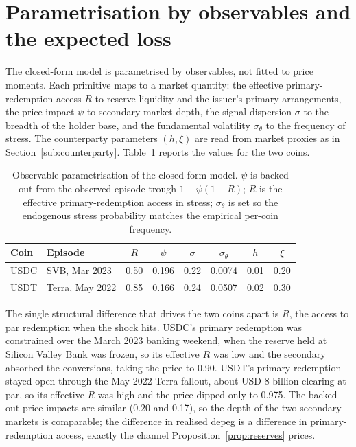 \section{Parametrisation by observables and the expected loss}\label{sec:calibration}

The closed-form model is parametrised by observables, not fitted to price moments. Each primitive maps to a market quantity: the effective primary-redemption access $R$ to reserve liquidity and the issuer's primary arrangements, the price impact $\psi$ to secondary market depth, the signal dispersion $\sigma$ to the breadth of the holder base, and the fundamental volatility $\sigma_\theta$ to the frequency of stress. The counterparty parameters $(h,\xi)$ are read from market proxies as in Section~\ref{sub:counterparty}. Table~\ref{tab:cg_params} reports the values for the two coins.

\begin{table}[H]
\centering
\caption{Observable parametrisation of the closed-form model. $\psi$ is backed out from the observed episode trough $1-\psi(1-R)$; $R$ is the effective primary-redemption access in stress; $\sigma_\theta$ is set so the endogenous stress probability matches the empirical per-coin frequency.}\label{tab:cg_params}
\begin{tabular}{llcccccc}
\toprule
Coin & Episode & $R$ & $\psi$ & $\sigma$ & $\sigma_\theta$ & $h$ & $\xi$ \\
\midrule
USDC & SVB, Mar 2023   & 0.50 & 0.196 & 0.22 & 0.0074 & 0.01 & 0.20 \\
USDT & Terra, May 2022 & 0.85 & 0.166 & 0.24 & 0.0507 & 0.02 & 0.30 \\
\bottomrule
\end{tabular}
\end{table}

The single structural difference that drives the two coins apart is $R$, the access to par redemption when the shock hits. USDC's primary redemption was constrained over the March 2023 banking weekend, when the reserve held at Silicon Valley Bank was frozen, so its effective $R$ was low and the secondary absorbed the conversions, taking the price to 0.90. USDT's primary redemption stayed open through the May 2022 Terra fallout, about USD 8 billion clearing at par, so its effective $R$ was high and the price dipped only to 0.975. The backed-out price impacts are similar (0.20 and 0.17), so the depth of the two secondary markets is comparable; the difference in realised depeg is a difference in primary-redemption access, exactly the channel Proposition~\ref{prop:reserves} prices.

